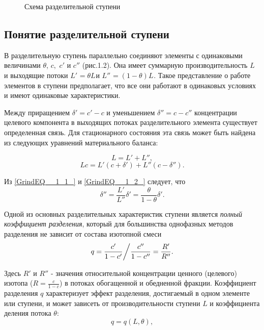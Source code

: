 \begin{figure}[ht]
  \caption{Схема разделительной ступени }\label{1_1}
\end{figure}


\subsection{Понятие разделительной ступени}


В разделительную ступень параллельно соединяют элементы с одинаковыми величинами $\theta $, $c,$ $ $$c'$ и $c''$ (рис.1.2). Она имеет суммарную производительность $L$ и выходящие потоки $L'_{} =\theta L_{} $и $L''_{} =(1-\theta )L_{} $. Такое представление о работе элементов в ступени предполагает, что все они работают в одинаковых условиях и имеют одинаковые характеристики.

Между приращением $\delta '=c'-c$ и уменьшением $\delta ''=c-c''$ концентрации целевого компонента в выходящих потоках разделительного элемента существует определенная связь. Для стационарного состояния эта связь может быть найдена из следующих уравнений материального баланса:

\begin{equation} \label{GrindEQ__1_1_} 
L=L'+L'', 
\end{equation} 
\begin{equation} \label{GrindEQ__1_2_} 
Lc=L'(c+\delta ')+L''(c-\delta ''). 
\end{equation} 

Из \ref{GrindEQ__1_1_} и \ref{GrindEQ__1_2_} следует, что 
\begin{equation} \label{GrindEQ__1_3_} 
\delta ''=\frac{L'}{L''} \delta '=\frac{\theta }{1-\theta } \delta '. 
\end{equation} 

Одной из основных разделительных характеристик ступени является \textit{полный коэффициент разделения}, который для большинства однофазных методов разделения не зависит от состава изотопной смеси
\begin{equation} \label{GrindEQ__1_4_} 
q={\frac{c'}{1-c'}  \mathord{\left/{\vphantom{\frac{c'}{1-c'}  \frac{c''}{1-c''} =\frac{R'}{R''} }}\right.\kern-\nulldelimiterspace} \frac{c''}{1-c''} =\frac{R'}{R''} } .                              
\end{equation} 

Здесь $R'$ и $R''$ - значения относительной концентрации ценного (целевого) изотопа ($R=\frac{c}{1-c} $) в потоках обогащенной и обедненной фракции. Коэффициент разделения $q$ характеризует эффект разделения, достигаемый в одном элементе или ступени, и может зависеть от производительности ступени $L$ и коэффициента деления потока $\theta $:
\begin{equation} \label{GrindEQ__1_5_} 
q=q(L,\theta ), 
\end{equation} 

